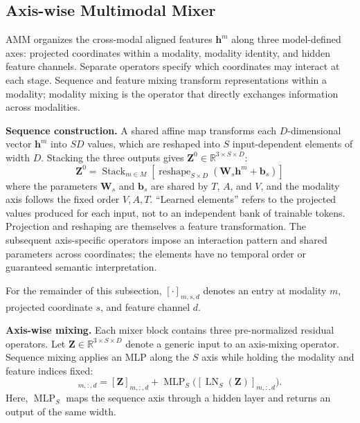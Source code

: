 \documentclass[letterpaper]{article} %
\begin{document}
\subsection{Axis-wise Multimodal Mixer}
AMM organizes the cross-modal aligned features $\mathbf{h}^{m}$ along three model-defined axes: projected coordinates within a modality, modality identity, and hidden feature channels. Separate operators specify which coordinates may interact at each stage. Sequence and feature mixing transform representations within a modality; modality mixing is the operator that directly exchanges information across modalities.



\noindent\textbf{Sequence construction.} A shared affine map transforms each $D$-dimensional vector $\mathbf{h}^{m}$ into $SD$ values, which are reshaped into $S$ input-dependent elements of width $D$. Stacking the three outputs gives $\mathbf{Z}^{0}\in\mathbb{R}^{3\times S\times D}$:
\begin{equation}
\mathbf{Z}^{0} =\operatorname{Stack}_{m\in M}
  \left[
  \operatorname{reshape}_{S\times D}
  (\mathbf{W}_{s}\mathbf{h}^{m}+\mathbf{b}_{s})
  \right]
\label{eq:sequence_construction}
\end{equation}
where the parameters $\mathbf{W}_{s}$ and $\mathbf{b}_{s}$ are shared by $T$, $A$, and $V$, and the modality axis follows the fixed order $V,A,T$. ``Learned elements'' refers to the projected values produced for each input, not to an independent bank of trainable tokens. Projection and reshaping are themselves a feature transformation. The subsequent axis-specific operators impose an interaction pattern and shared parameters across coordinates; the elements have no temporal order or guaranteed semantic interpretation.

For the remainder of this subsection, $[\cdot]_{m,s,d}$ denotes an entry at modality $m$, projected coordinate $s$, and feature channel $d$.

\noindent\textbf{Axis-wise mixing.}
Each mixer block contains three pre-normalized residual operators. Let $\mathbf{Z}\in\mathbb{R}^{3\times S\times D}$ denote a generic input to an axis-mixing operator. Sequence mixing applies an MLP along the $S$ axis while holding the modality and feature indices fixed:
\begin{equation}
[\mathcal{S}(\mathbf{Z})]_{m,:,d}
=[\mathbf{Z}]_{m,:,d}
+\operatorname{MLP}_{S}
  \bigl([\operatorname{LN}_{S}(\mathbf{Z})]_{m,:,d}\bigr).
\label{eq:sequence_mixing}
\end{equation}
Here, $\operatorname{MLP}_{S}$ maps the sequence axis through a hidden
layer and returns an output of the same width.
\end{document}
